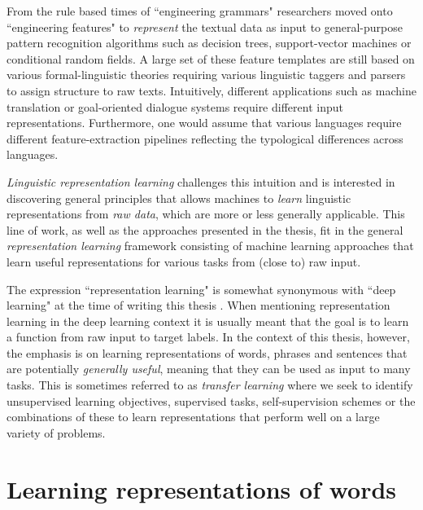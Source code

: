 From the rule based times of ``engineering grammars" researchers moved onto ``engineering features"
to \emph{represent} the textual data as input to general-purpose pattern recognition algorithms such as
decision trees, support-vector machines or conditional random fields.
A large set of these feature templates are still based on various formal-linguistic theories requiring various
linguistic taggers and parsers to assign structure to raw texts.
Intuitively, different applications such as machine translation or goal-oriented dialogue systems
require different input representations. Furthermore, one would assume that various languages require
different feature-extraction pipelines reflecting the typological differences across languages.

\emph{Linguistic representation learning} challenges this intuition and is interested in
discovering general principles that allows machines to  \emph{learn}
linguistic representations from \emph{raw data}, which are more or less
generally applicable. This line of work, as well as the approaches presented in the thesis,
fit in the general \emph{representation learning}  framework consisting of
machine learning approaches that learn useful representations
for various tasks from (close to) raw input.

The expression ``representation learning" is somewhat synonymous with ``deep learning" at the time
of writing this thesis \citep{bengio2013representation}.
When mentioning representation learning in the deep learning context
it is usually meant that the goal is to learn a function from raw input to target labels. In the
context of this thesis, however, the emphasis is on learning representations of words, phrases and
sentences that are potentially \emph{generally useful}, meaning
that they can be used as input to many tasks. This is sometimes referred to as
\emph{transfer learning} \citep{pratt1993discriminability} 
where we seek to identify unsupervised learning objectives,
supervised tasks, self-supervision schemes or the combinations of these to  learn representations that
perform well on a large variety of problems.

\section{Learning representations of words}


